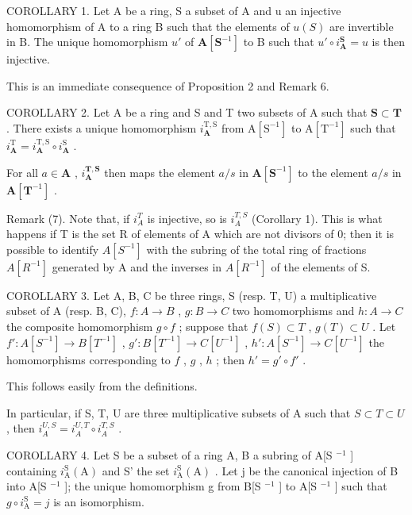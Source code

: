 COROLLARY 1. Let A be a ring, S a subset of A and u an injective homomorphism of A to a ring B such that the elements of \(u(S)\) are invertible in B. The unique homomorphism \(u'\) of \(\mathbf{A}[\mathbf{S}^{-1}]\) to B such that \(u' \circ i_{\mathbf{A}}^{\mathbf{S}} = u\) is then injective.

This is an immediate consequence of Proposition 2 and Remark 6.

COROLLARY 2. Let A be a ring and S and T two subsets of A such that \(\mathbf{S} \subset \mathbf{T}\) . There exists a unique homomorphism \(i_{\mathbf{A}}^{\mathrm{T},\mathrm{S}}\) from \(\mathrm{A}[\mathrm{S}^{-1}]\) to \(\mathrm{A}[\mathrm{T}^{-1}]\) such that \(i_{\mathbf{A}}^{\mathrm{T}} = i_{\mathbf{A}}^{\mathrm{T},\mathrm{S}} \circ i_{\mathbf{A}}^{\mathrm{S}}\) .

For all \(a \in \mathbf{A}\) , \(i_{\mathbf{A}}^{\mathbf{T},\mathbf{S}}\) then maps the element \(a / s\) in \(\mathbf{A}[\mathbf{S}^{-1}]\) to the element \(a / s\) in \(\mathbf{A}[\mathbf{T}^{-1}]\) .

Remark (7). Note that, if \(i_{A}^{T}\) is injective, so is \(i_{A}^{T,S}\) (Corollary 1). This is what happens if T is the set R of elements of A which are not divisors of 0; then it is possible to identify \(A[S^{-1}]\) with the subring of the total ring of fractions \(A[R^{-1}]\) generated by A and the inverses in \(A[R^{-1}]\) of the elements of S.

COROLLARY 3. Let A, B, C be three rings, S (resp. T, U) a multiplicative subset of A (resp. B, C), \(f\colon A \to B\) , \(g\colon B \to C\) two homomorphisms and \(h\colon A \to C\) the composite homomorphism \(g \circ f\) ; suppose that \(f(S) \subset T\) , \(g(T) \subset U\) . Let \(f'\colon A[S^{-1}] \to B[T^{-1}]\) , \(g'\colon B[T^{-1}] \to C[U^{-1}]\) , \(h'\colon A[S^{-1}] \to C[U^{-1}]\) the homomorphisms corresponding to \(f\) , \(g\) , \(h\) ; then \(h' = g' \circ f'\) .

This follows easily from the definitions.

In particular, if S, T, U are three multiplicative subsets of A such that \(S \subset T \subset U\) , then \(i_{A}^{U,S} = i_{A}^{U,T} \circ i_{A}^{T,S}\) .

COROLLARY 4. Let S be a subset of a ring A, B a subring of A{[}S \(^{-1}\) {]} containing \(i_{\text{A}}^{\text{S}}(\text{A})\) and S' the set \(i_{\text{A}}^{\text{S}}(\text{A})\) . Let j be the canonical injection of B into A{[}S \(^{-1}\) {]}; the unique homomorphism g from B{[}S \(^{-1}\) {]} to A{[}S \(^{-1}\) {]} such that \(g \circ i_{\text{A}}^{\text{S}} = j\) is an isomorphism.

